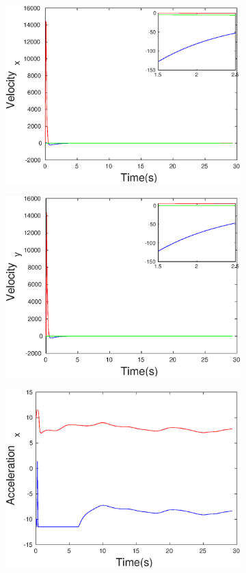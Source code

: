 \begin{figure}[h]
\begin{subfigure}{.5\linewidth}
\centering
\includegraphics[width=.9\linewidth]{figures/HInf/s3pmHInfVelocity_x}
\end{subfigure}
\begin{subfigure}{.5\linewidth}
\centering
\includegraphics[width=.9\linewidth]{figures/HInf/s3pmHInfVelocity_y}
\end{subfigure}
\begin{subfigure}{.5\linewidth}
\centering
\includegraphics[width=.9\linewidth]{figures/HInf/s3pmHInfAcceleration_x}

\end{subfigure}
\end{figure}
